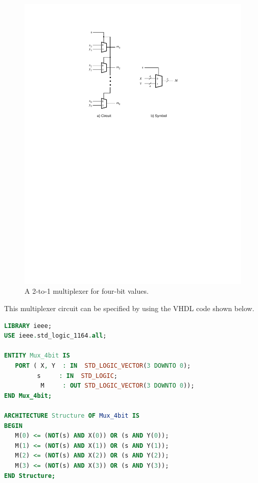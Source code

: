 \documentclass[11pt, twoside, pdftex]{article}
\begin{document}
\begin{figure}[H]
   \begin{center}
      \includegraphics[scale=1.0]{figures/mux_4bit.pdf}
   \caption{A 2-to-1 multiplexer for four-bit values.} 
	 \label{fig:mux_4bit}
	 \end{center}
\end{figure}

This multiplexer circuit can be specified by using the VHDL code shown below.
~\\
\begin{lstlisting}[language=VHDL]
LIBRARY ieee;
USE ieee.std_logic_1164.all;

ENTITY Mux_4bit IS 
   PORT ( X, Y  : IN  STD_LOGIC_VECTOR(3 DOWNTO 0);
   		 s     : IN  STD_LOGIC; 
          M     : OUT STD_LOGIC_VECTOR(3 DOWNTO 0));
END Mux_4bit;

ARCHITECTURE Structure OF Mux_4bit IS
BEGIN
   M(0) <= (NOT(s) AND X(0)) OR (s AND Y(0));
   M(1) <= (NOT(s) AND X(1)) OR (s AND Y(1));
   M(2) <= (NOT(s) AND X(2)) OR (s AND Y(2));
   M(3) <= (NOT(s) AND X(3)) OR (s AND Y(3));
END Structure;
\end{lstlisting}
\end{document}
